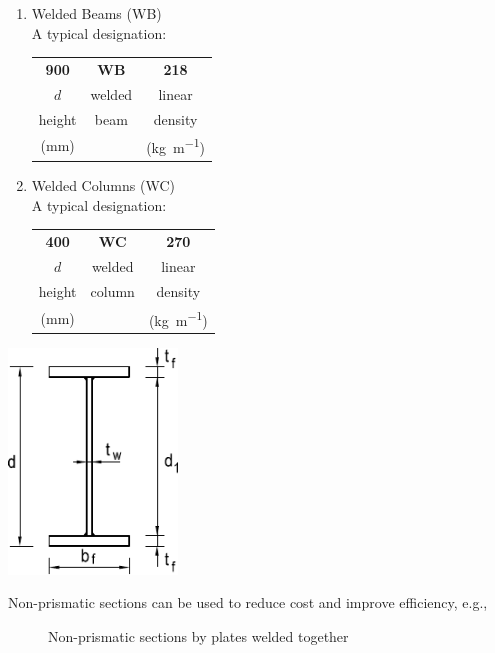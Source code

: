 \begin{minipage}[t]{9cm}
\begin{enumerate}
\item Welded Beams (WB)\\
A typical designation:
\begin{table}[H]\centering
\begin{tabular}{ccc}
	\textbf{900} & \textbf{WB} &        \textbf{218}        \\
	    $d$      &   welded    &           linear           \\
	   height    &    beam     &          density           \\
	 (\si{\mm})  &             & (\si{\kilogram\per\meter})
\end{tabular}
\end{table}
\item Welded Columns (WC)\\
A typical designation:
\begin{table}[H]\centering
\begin{tabular}{ccc}
	\textbf{400} & \textbf{WC} &        \textbf{270}        \\
	    $d$      &   welded    &           linear           \\
	   height    &   column    &          density           \\
	 (\si{\mm})  &             & (\si{\kilogram\per\meter})
\end{tabular}
\end{table}
\end{enumerate}
\end{minipage}\hfill
\begin{minipage}[t]{5cm}
\vfill\centering\includegraphics[width=4.5cm,valign=t]{PIC/CH02/WB}
\end{minipage}

Non-prismatic sections can be used to reduce cost and improve efficiency, e.g.,
\begin{figure}[H]
\centering
\caption{Non-prismatic sections by plates welded together}
\end{figure}

